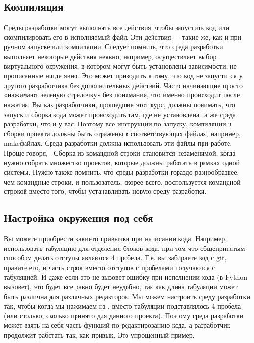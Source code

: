 \documentclass[letterpaper,10pt,russian]{sphinxmanual}
\begin{document}
\sphinxAtStartPar
{}


\subsection{Компиляция}
\label{\detokenize{educational_materials/ide/content:id5}}
\sphinxAtStartPar
Среды разработки могут выполнять все действия, чтобы запустить код или скомпилировать его в исполняемый файл. Эти действия — такие же, как и при ручном запуске или компиляции. Следует помнить, что среда разработки выполняет некоторые действия неявно, например, осуществляет выбор виртуального окружения, в котором могут быть установлены зависимости, не прописанные нигде явно. Это может приводить к тому, что код не запустится у другого разработчика без дополнительных действий. Часто начинающие просто «нажимают зеленую стрелочку» без понимания, что именно происходит после нажатия. Вы как разработчики, прошедшие этот курс, должны понимать, что запуск и сборка кода может происходить там, где не установлена та же среда разработки, что и у вас. Поэтому все инструкции по запуску, компиляции и сборки проекта должны быть отражены в соответствующих файлах, например, make\sphinxhyphen{}файлах. Среда разработки должна использовать эти файлы при работе. Проще говоря, . Сборка из командной строки становится незаменимой, когда нужно собрать множество проектов, которые должны работать в рамках одной системы. Нужно также помнить, что среды разработки гораздо разнообразнее, чем командные строки, и пользователь, скорее всего, воспользуется командной строкой вместо того, чтобы устанавливать новую среду разработки.


\subsection{Настройка окружения под себя}
\label{\detokenize{educational_materials/ide/content:id6}}
\sphinxAtStartPar
Вы можете приобрести какие\sphinxhyphen{}то привычки при написании кода. Например, использовать табуляцию для отделения блоков кода, при том что общепринятым способом делать отступы являются 4 пробела. Т.е. вы забираете код с git, правите его, и часть строк вместо отступов с пробелами получаются с табуляцией. И даже если это не вызовет ошибку при исполнении кода (в Python вызовет), это будет все равно будет неудобно, так как длина табуляции может быть различна для различных редакторов. Мы можем настроить среду разработки так, чтобы когда мы нажимаем на , вместо табуляции подставлялось 4 пробела (или столько, сколько принято для данного проекта). Поэтому среда разработки может взять на себя часть функций по редактированию кода, а разработчик продолжит работать так, как привык. Это упрощенный пример.
\end{document}
